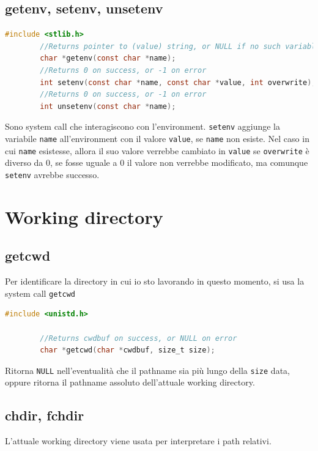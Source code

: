 \documentclass[a4paper, 12pt]{book}
\begin{document}
    \subsection{getenv, setenv, unsetenv}

    \begin{lstlisting}[language=C]
        #include <stlib.h>
        //Returns pointer to (value) string, or NULL if no such variable exists
        char *getenv(const char *name);
        //Returns 0 on success, or -1 on error
        int setenv(const char *name, const char *value, int overwrite);
        //Returns 0 on success, or -1 on error
        int unsetenv(const char *name);
    \end{lstlisting} 
    Sono system call che interagiscono con l'environment.
    \verb|setenv| aggiunge la variabile \verb|name| all'environment 
    con il valore \verb|value|, se \verb|name| non esiste. Nel caso 
    in cui \verb|name| esistesse, allora il suo valore verrebbe 
    cambiato in \verb|value| se \verb|overwrite| è diverso da 0, se fosse 
    uguale a 0 il valore non verrebbe modificato, ma comunque 
    \verb|setenv| avrebbe successo.

    \section{Working directory}

    \subsection{getcwd}

    Per identificare la directory in cui io sto lavorando
    in questo momento, si usa la system call \verb|getcwd|
    \begin{lstlisting}[language=C]
        #include <unistd.h>

        //Returns cwdbuf on success, or NULL on error
        char *getcwd(char *cwdbuf, size_t size);
    \end{lstlisting} 
    Ritorna \verb|NULL| nell'eventualità che il pathname 
    sia più lungo della \verb|size| data, oppure ritorna 
    il pathname assoluto dell'attuale working directory.

    \subsection{chdir, fchdir}

    L'attuale working directory viene usata per interpretare 
    i path relativi.
\end{document}
